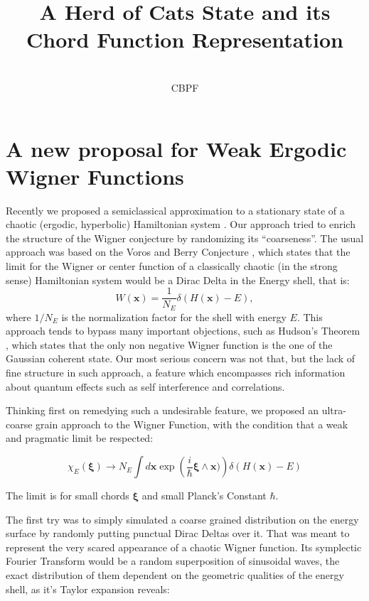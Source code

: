 \documentclass[a4paper,12pt]{article}
\title{A Herd of Cats State and its Chord Function Representation}
\author{\\CBPF}
\newcommand{\ihb}{\frac{i}{\hbar}}
\newcommand{\xfase}{\mathbf{x}}
\newcommand{\xifase}{ {\boldsymbol{\xi}} }
\begin{document}
\maketitle

\begin{abstract}

\end{abstract}


\section{A new proposal for  Weak Ergodic Wigner Functions}

Recently we proposed a semiclassical approximation to 
a stationary state of a chaotic (ergodic, hyperbolic)
Hamiltonian system \cite{Deltas}.
Our approach tried to enrich the structure of the Wigner
conjecture by randomizing its ``coarseness''.  
The usual approach was based on the Voros and Berry
Conjecture \cite{Voros76, BerryRIR}, which states that
the limit for the Wigner or center function of a classically
chaotic (in the strong sense) Hamiltonian system would be
a Dirac Delta in the Energy shell, that is:
\begin{equation}
W(\xfase)=\frac{1}{N_E} \delta(H(\xfase)-E), 
\end{equation}
where $1/N_E$ is the normalization factor for the 
shell with energy  $E$. This approach tends to bypass
many important objections, such as Hudson's Theorem
\cite{Hudson}, which states that the only non negative
Wigner function is the one of the Gaussian coherent state.
Our most serious concern was not that, but the lack
of fine structure in such approach, a feature which
encompasses rich information about quantum effects
such as self interference and correlations. 

Thinking first on remedying such a undesirable feature,
we proposed an ultra-coarse grain approach to the Wigner
Function, with the condition that a weak and pragmatic
limit be respected:

\begin{equation}
\chi_E(\xifase)\rightarrow N_E 
\int d \xfase \exp\left(\ihb \xifase \wedge \xfase) \right)
\delta(H(\xfase)-E)
\end{equation}

The limit is for small chords $\xifase$ and small Planck's
Constant $\hbar$.

The first try was to simply simulated a coarse grained
distribution on the energy surface by randomly putting
punctual Dirac Deltas over it. That was meant to represent
the very scared appearance of a chaotic Wigner function.
Its symplectic Fourier Transform would be a random superposition
of sinusoidal waves, the exact distribution of them dependent
on the geometric qualities of the energy shell, as 
it's Taylor expansion reveals:
\end{document}
